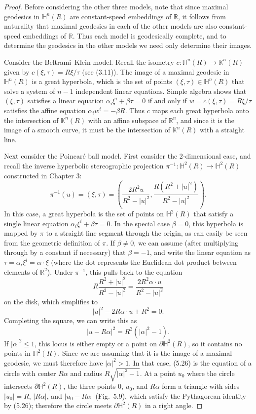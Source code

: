 \begin{theorem}
\begin{proof}
Before considering the other three models, note that since maximal geodesics in $\mathbb{H}^n(R)$ are constant-speed embeddings of $\mathbb{R}$, it follows from naturality that maximal geodesics in each of the other models are also constant-speed embeddings of $\mathbb{R}$. Thus each model is geodesically complete, and to determine the geodesics in the other models we need only determine their images.

Consider the Beltrami--Klein model. Recall the isometry $c: \mathbb{H}^n(R) \to \mathbb{K}^n(R)$ given by $c(\xi,\tau) = R\xi/\tau$ (see (3.11)). The image of a maximal geodesic in $\mathbb{H}^n(R)$ is a great hyperbola, which is the set of points $(\xi,\tau) \in \mathbb{H}^n(R)$ that solve a system of $n-1$ independent linear equations. Simple algebra shows that $(\xi,\tau)$ satisfies a linear equation $\alpha_i\xi^i + \beta\tau = 0$ if and only if $w = c(\xi,\tau) = R\xi/\tau$ satisfies the affine equation $\alpha_i w^i = -\beta R$. Thus $c$ maps each great hyperbola onto the intersection of $\mathbb{K}^n(R)$ with an affine subspace of $\mathbb{R}^n$, and since it is the image of a smooth curve, it must be the intersection of $\mathbb{K}^n(R)$ with a straight line.

Next consider the Poincar\'e ball model. First consider the 2-dimensional case, and recall the inverse hyperbolic stereographic projection $\pi^{-1}: \mathbb{H}^2(R) \to \mathbb{H}^2(R)$ constructed in Chapter 3:
\[
\pi^{-1}(u) = (\xi,\tau) = \left( \frac{2R^2u}{R^2-|u|^2}, \frac{R(R^2+|u|^2)}{R^2-|u|^2} \right).
\]
In this case, a great hyperbola is the set of points on $\mathbb{H}^2(R)$ that satisfy a single linear equation $\alpha_i\xi^i + \beta\tau = 0$. In the special case $\beta = 0$, this hyperbola is mapped by $\pi$ to a straight line segment through the origin, as can easily be seen from the geometric definition of $\pi$. If $\beta \ne 0$, we can assume (after multiplying through by a constant if necessary) that $\beta = -1$, and write the linear equation as $\tau = \alpha_i\xi^i = \alpha \cdot \xi$ (where the dot represents the Euclidean dot product between elements of $\mathbb{R}^2$). Under $\pi^{-1}$, this pulls back to the equation
\[
R\frac{R^2+|u|^2}{R^2-|u|^2} = \frac{2R^2\alpha \cdot u}{R^2-|u|^2}
\]
on the disk, which simplifies to
\[
|u|^2 - 2R\alpha \cdot u + R^2 = 0.
\]
Completing the square, we can write this as
\begin{equation}
|u - R\alpha|^2 = R^2(|\alpha|^2 - 1). \tag{5.26}
\end{equation}
If $|\alpha|^2 \le 1$, this locus is either empty or a point on $\partial\mathbb{H}^2(R)$, so it contains no points in $\mathbb{H}^2(R)$. Since we are assuming that it is the image of a maximal geodesic, we must therefore have $|\alpha|^2 > 1$. In that case, (5.26) is the equation of a circle with center $R\alpha$ and radius $R\sqrt{|\alpha|^2 - 1}$. At a point $u_0$ where the circle intersects $\partial\mathbb{H}^2(R)$, the three points $0$, $u_0$, and $R\alpha$ form a triangle with sides $|u_0| = R$, $|R\alpha|$, and $|u_0 - R\alpha|$ (Fig.\ 5.9), which satisfy the Pythagorean identity by (5.26); therefore the circle meets $\partial\mathbb{H}^2(R)$ in a right angle.


\end{proof}
\end{theorem}

